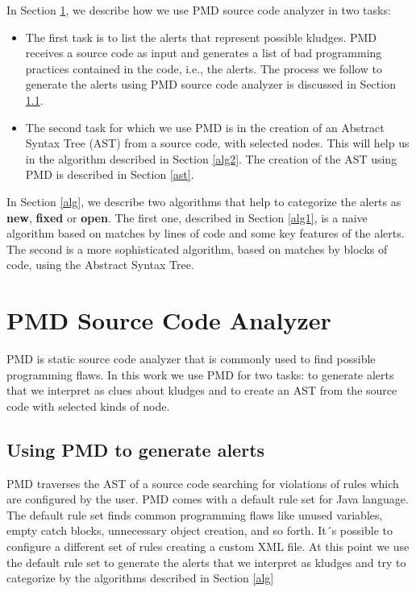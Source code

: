 \documentclass[
]{article}
\begin{document}
In Section \ref{pmd}, we describe how we use PMD source code analyzer in
two tasks:

\begin{itemize}
\item The first task is to list the alerts that represent possible kludges. 
PMD receives a source code as input and generates a list of bad programming practices contained in the code, i.e., the alerts. 
The process we follow to generate the alerts using PMD source code analyzer is discussed in Section \ref{pmd_alerts}. 
\item The second task for which we use PMD is in the creation of an Abstract Syntax Tree (AST) from a source code, with selected nodes. 
This will help us in the algorithm described in Section \ref{alg2}. 
The creation of the AST using PMD is described in Section \ref{ast}.
\end{itemize}

In Section \ref{alg}, we describe two algorithms that help to categorize
the alerts as \textbf{new}, \textbf{fixed} or \textbf{open}. The first
one, described in Section \ref{alg1}, is a naive algorithm based on
matches by lines of code and some key features of the alerts. The second
is a more sophisticated algorithm, based on matches by blocks of code,
using the Abstract Syntax Tree.

\section{PMD Source Code Analyzer}\label{pmd}

PMD is static source code analyzer that is commonly used to find
possible programming flaws. In this work we use PMD for two tasks: to
generate alerts that we interpret as clues about kludges and to create
an AST from the source code with selected kinds of node.

\subsection{Using PMD to generate alerts}\label{pmd_alerts}

PMD traverses the AST of a source code searching for violations of rules
which are configured by the user. PMD comes with a default rule set for
Java language. The default rule set finds common programming flaws like
unused variables, empty catch blocks, unnecessary object creation, and
so forth. It´s possible to configure a different set of rules creating a
custom XML file. At this point we use the default rule set to generate
the alerts that we interpret as kludges and try to categorize by the
algorithms described in Section \ref{alg}
\end{document}
